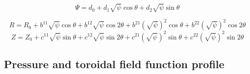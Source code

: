 \documentclass{llncs}
\begin{document}
\[ \Psi = d_0 + d_1 \sqrt{\psi} \cos \theta + d_2 \sqrt{\psi} \sin \theta \]

\begin{equation}
  R = R_0 + b^{11} \sqrt{\psi} \cos \theta + b^{12} \sqrt{\psi} \cos 2 \theta
  + b^{21} \left( \sqrt{\psi} \right)^2 \cos \theta + b^{22} \left(
  \sqrt{\psi} \right)^2 \cos 2 \theta
\end{equation}
\begin{equation}
  Z = Z_0 + c^{11} \sqrt{\psi} \sin \theta + c^{12} \sqrt{\psi} \sin 2 \theta
  + c^{21} \left( \sqrt{\psi} \right)^2 \sin \theta + c^{22} \left(
  \sqrt{\psi} \right)^2 \sin 2 \theta
\end{equation}

\subsection{Pressure and toroidal field function profile}
\end{document}
